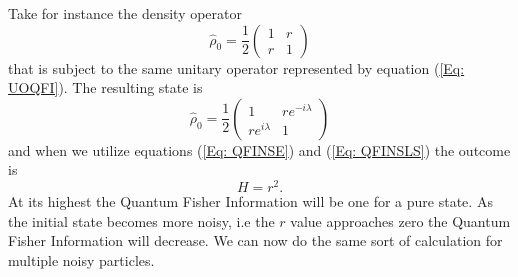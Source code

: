\documentclass[twocolumn]{article}
\begin{document}
Take for instance the density operator
\begin{equation} \label{Eq: NSDO0}
\hat{\rho}_0=\frac{1}{2}
\begin{pmatrix}
1 & r \\
r & 1
\end{pmatrix}
\end{equation}
that is subject to the same unitary operator represented by equation (\ref{Eq: UOQFI}). The resulting state is
\begin{equation} \label{Eq: ENSDO0}
\hat{\rho}_0=\frac{1}{2}
\begin{pmatrix}
1 & re^{-i\lambda}\\
re^{i\lambda} & 1
\end{pmatrix}
\end{equation}
and when we utilize equations (\ref{Eq: QFINSE}) and (\ref{Eq: QFINSLS}) the outcome is
\begin{equation} \label{Eq: NSQFISR}
H=r^2.
\end{equation}
At its highest the Quantum Fisher Information will be one for a pure state. As the initial state becomes more noisy, i.e the $r$ value approaches zero the Quantum Fisher Information will decrease.  We can now do the same sort of calculation for multiple noisy particles.
\end{document}
